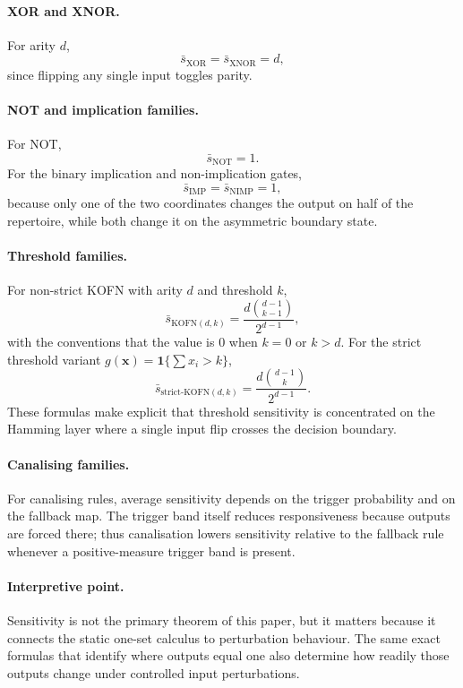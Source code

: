 \documentclass[11pt]{article}
\theoremstyle{definition}
\begin{document}
\paragraph{XOR and XNOR.}
For arity \(d\),
\[
\bar{s}_{\mathrm{XOR}}=\bar{s}_{\mathrm{XNOR}}=d,
\]
since flipping any single input toggles parity.

\paragraph{NOT and implication families.}
For NOT,
\[
\bar{s}_{\mathrm{NOT}}=1.
\]
For the binary implication and non-implication gates,
\[
\bar{s}_{\mathrm{IMP}}=\bar{s}_{\mathrm{NIMP}}=1,
\]
because only one of the two coordinates changes the output on half of the repertoire, while both change it on the asymmetric boundary state.

\paragraph{Threshold families.}
For non-strict KOFN with arity \(d\) and threshold \(k\),
\[
\bar{s}_{\mathrm{KOFN}(d,k)}=\frac{d\binom{d-1}{k-1}}{2^{d-1}},
\]
with the conventions that the value is \(0\) when \(k=0\) or \(k>d\). For the strict threshold variant \(g(\mathbf{x})=\mathbf{1}\{\sum x_i>k\}\),
\[
\bar{s}_{\mathrm{strict\text{-}KOFN}(d,k)}=\frac{d\binom{d-1}{k}}{2^{d-1}}.
\]
These formulas make explicit that threshold sensitivity is concentrated on the Hamming layer where a single input flip crosses the decision boundary.

\paragraph{Canalising families.}
For canalising rules, average sensitivity depends on the trigger probability and on the fallback map. The trigger band itself reduces responsiveness because outputs are forced there; thus canalisation lowers sensitivity relative to the fallback rule whenever a positive-measure trigger band is present.

\paragraph{Interpretive point.}
Sensitivity is not the primary theorem of this paper, but it matters because it connects the static one-set calculus to perturbation behaviour. The same exact formulas that identify where outputs equal one also determine how readily those outputs change under controlled input perturbations.
\end{document}
